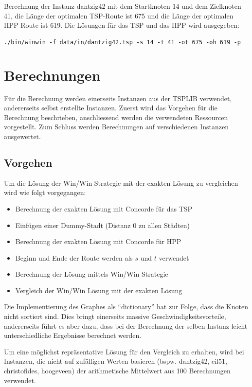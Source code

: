 \documentclass[11pt,a4paper]{article}
\begin{document}
Berechnung der Instanz dantzig42 mit dem Startknoten 14 und dem Zielknoten 41, die Länge der optimalen TSP-Route ist 675 und die Länge der optimalen HPP-Route ist 619. Die Lösungen für das TSP und das HPP wird ausgegeben:
\begin{flushleft}
\texttt{./bin/winwin -f data/in/dantzig42.tsp -s 14 -t 41 -ot 675 -oh 619 -p}
\end{flushleft}

\section{Berechnungen}
Für die Berechnung werden einerseits Instanzen aus der TSPLIB verwendet, andererseits selbst erstellte Instanzen.
Zuerst wird das Vorgehen für die Berechnung beschrieben, anschliessend werden die verwendeten Ressourcen vorgestellt. Zum Schluss werden Berechnungen auf verschiedenen Instanzen ausgewertet.

\subsection{Vorgehen}
Um die Lösung der Win/Win Strategie mit der exakten Lösung zu vergleichen wird wie folgt vorgegangen:

\begin{itemize}
    \item Berechnung der exakten Lösung mit Concorde für das TSP 
    \item Einfügen einer Dummy-Stadt (Distanz 0 zu allen Städten)
    \item Berechnung der exakten Lösung mit Concorde für HPP 
    \item Beginn und Ende der Route werden als $s$ und $t$ verwendet
    \item Berechnung der Lösung mittels Win/Win Strategie
    \item Vergleich der Win/Win Lösung mit der exakten Lösung
\end{itemize}

Die Implementierung des Graphes als "`dictionary"' hat zur Folge, dass die Knoten nicht sortiert sind. Dies bringt einerseits massive Geschwindigkeitsvorteile, andererseits führt es aber dazu, dass bei der Berechnung der selben Instanz leicht unterschiedliche Ergebnisse berechnet werden.

Um eine möglichst repräsentative Lösung für den Vergleich zu erhalten, wird bei Instanzen, die nicht auf zufälligen Werten basieren (bspw. dantzig42, eil51, christofides, hoogeveen) der arithmetische Mittelwert aus 100 Berechnungen verwendet.
\end{document}
